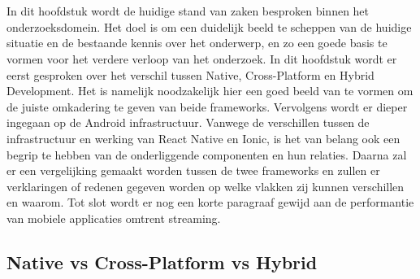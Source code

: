 \chapter{}%
\label{ch:stand-van-zaken}




In dit hoofdstuk wordt de huidige stand van zaken besproken binnen het onderzoeksdomein. Het doel is om een duidelijk beeld te scheppen van de huidige situatie en de bestaande kennis over het onderwerp, en zo een goede basis te vormen voor het verdere verloop van het onderzoek. In dit hoofdstuk wordt er eerst gesproken over het verschil tussen Native, Cross-Platform en Hybrid Development. Het is namelijk noodzakelijk hier een goed beeld van te vormen om de juiste omkadering te geven van beide frameworks. Vervolgens wordt er dieper ingegaan op de Android infrastructuur. Vanwege de verschillen tussen de infrastructuur en werking van React Native en Ionic, is het van belang ook een begrip te hebben van de onderliggende componenten en hun relaties. Daarna zal er een vergelijking gemaakt worden tussen de twee frameworks en zullen er verklaringen of redenen gegeven worden op welke vlakken zij kunnen verschillen en waarom. Tot slot wordt er nog een korte paragraaf gewijd aan de performantie van mobiele applicaties omtrent streaming.

\section{Native vs Cross-Platform vs Hybrid}
\label{sec:native-cross-hybrid}

